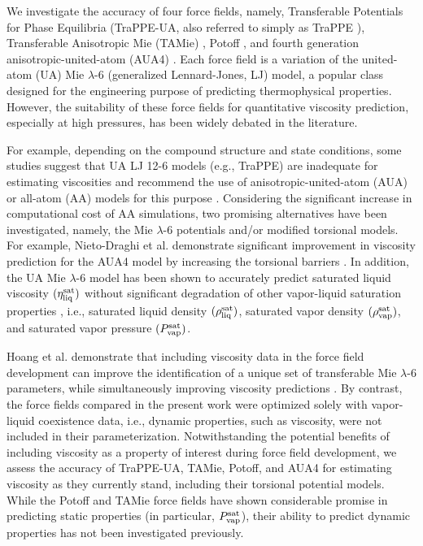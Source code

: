 \documentclass[preprint,review,12pt]{elsarticle}
\begin{document}
	We investigate the accuracy of four force fields, namely, Transferable Potentials for Phase Equilibria (TraPPE-UA, also referred to simply as TraPPE \cite{TraPPE,Martin1999,TraPPEUA2}), Transferable Anisotropic Mie (TAMie) \cite{TAMie,Weidler2016}, Potoff \cite{Mie,Potoff_branched}, and fourth generation anisotropic-united-atom (AUA4) \cite{AUA4,Nieto2008}. Each force field is a variation of the united-atom (UA) Mie $\lambda$-6 (generalized Lennard-Jones, LJ) model, a popular class designed for the engineering purpose of predicting thermophysical properties. However, the suitability of these force fields for quantitative viscosity prediction, especially at high pressures, has been widely debated in the literature.
	
	For example, depending on the compound structure and state conditions, some studies suggest that UA LJ 12-6 models (e.g., TraPPE) are inadequate for estimating viscosities and recommend the use of anisotropic-united-atom (AUA) or all-atom (AA) models for this purpose \cite{Allen1997,Payal2012,Mondello1997,Ungerer2007}. Considering the significant increase in computational cost of AA simulations, two promising alternatives have been investigated, namely, the Mie $\lambda$-6 potentials and/or modified torsional models. For example, Nieto-Draghi et al. demonstrate significant improvement in viscosity prediction for the AUA4 model by increasing the torsional barriers \cite{Nieto2006}. In addition, the UA Mie $\lambda$-6 model has been shown to accurately predict saturated liquid viscosity $(\eta_{\rm liq}^{\rm sat})$ without significant degradation of other vapor-liquid saturation properties \cite{Gordon2006}, i.e., saturated liquid density $(\rho_{\rm liq}^{\rm sat})$, saturated vapor density $(\rho_{\rm vap}^{\rm sat})$, and saturated vapor pressure $(P_{\rm vap}^{\rm sat})$.   
	        
	Hoang et al. demonstrate that including viscosity data in the force field development can improve the identification of a unique set of transferable Mie $\lambda$-6 parameters, while simultaneously improving viscosity predictions \cite{Hoang2017}. By contrast, the force fields compared in the present work were optimized solely with vapor-liquid coexistence data, i.e., dynamic properties, such as viscosity, were not included in their parameterization. Notwithstanding the potential benefits of including viscosity as a property of interest during force field development, we assess the accuracy of TraPPE-UA, TAMie, Potoff, and AUA4 for estimating viscosity as they currently stand, including their torsional potential models. While the Potoff and TAMie force fields have shown considerable promise in predicting static properties (in particular, $P_{\rm vap}^{\rm sat}$), their ability to predict dynamic properties has not been investigated previously. 
        
\end{document}
